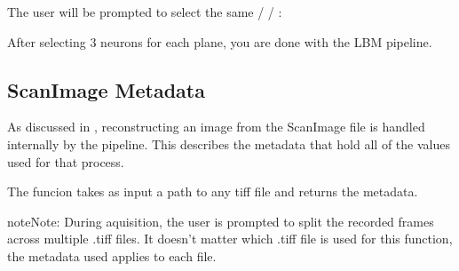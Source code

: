 \documentclass[letterpaper,10pt,english]{sphinxmanual}
\begin{document}
\sphinxAtStartPar
The user will be prompted to select the same  /  / :

\noindent{}

\sphinxAtStartPar
After selecting 3 neurons for each plane, you are done with the LBM pipeline.

\sphinxstepscope


\subsection{ScanImage Metadata}
\label{\detokenize{user_guide/metadata:scanimage-metadata}}\label{\detokenize{user_guide/metadata::doc}}
\sphinxAtStartPar
As discussed in {\hyperref[\detokenize{user_guide/pre_processing:pipeline-step-1}]{}}, reconstructing an image from the ScanImage  file is handled internally by the pipeline. This describes
the metadata that hold all of the values used for that process.

\sphinxAtStartPar
The funcion {\hyperref[\detokenize{api/utils:get_metadata}]{}} takes as input a path to any  tiff file and returns the metadata.

\label{\detokenize{user_guide/metadata:mdetadata-disclaimer}}
\begin{sphinxadmonition}{note}{Note:}
\sphinxAtStartPar
During aquisition, the user is prompted to split the recorded frames across multiple .tiff files.
It doesn’t matter which .tiff file is used for this function, the metadata used applies to each file.
\end{sphinxadmonition}
\end{document}
